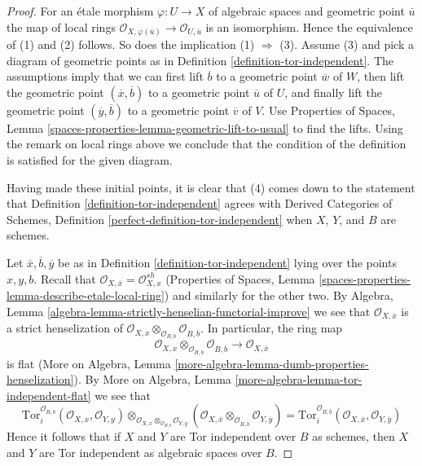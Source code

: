 \begin{proof}
For an \'etale morphism $\varphi : U \to X$ of algebraic spaces
and geometric point $\overline{u}$ the map of local rings
$\mathcal{O}_{X, \varphi(\overline{u})} \to \mathcal{O}_{U, \overline{u}}$
is an isomorphism. Hence the equivalence of (1) and (2) follows.
So does the implication (1) $\Rightarrow$ (3). Assume (3) and
pick a diagram of geometric points as in
Definition \ref{definition-tor-independent}.
The assumptions imply that we can first lift $\overline{b}$ to a geometric
point $\overline{w}$ of $W$, then lift the geometric point
$(\overline{x}, \overline{b})$ to a geometric point $\overline{u}$ of $U$,
and finally lift the geometric point
$(\overline{y}, \overline{b})$ to a geometric point $\overline{v}$ of $V$.
Use Properties of Spaces, Lemma
\ref{spaces-properties-lemma-geometric-lift-to-usual}
to find the lifts.
Using the remark on local rings above we conclude that the condition
of the definition is satisfied for the given diagram.

\medskip\noindent
Having made these initial points, it is clear that (4) comes down to the
statement that
Definition \ref{definition-tor-independent}
agrees with
Derived Categories of Schemes, Definition
\ref{perfect-definition-tor-independent}
when $X$, $Y$, and $B$ are schemes.

\medskip\noindent
Let $\overline{x}, \overline{b}, \overline{y}$ be as in
Definition \ref{definition-tor-independent} lying over the points
$x, y, b$. Recall that
$\mathcal{O}_{X, \overline{x}} = \mathcal{O}_{X, x}^{sh}$
(Properties of Spaces, Lemma
\ref{spaces-properties-lemma-describe-etale-local-ring}) and similarly
for the other two. By Algebra, Lemma
\ref{algebra-lemma-strictly-henselian-functorial-improve} we see that
$\mathcal{O}_{X, \overline{x}}$ is a strict henselization of
$\mathcal{O}_{X, x} \otimes_{\mathcal{O}_{B, b}} \mathcal{O}_{B, \overline{b}}$.
In particular, the ring map
$$
\mathcal{O}_{X, x} \otimes_{\mathcal{O}_{B, b}} \mathcal{O}_{B, \overline{b}}
\longrightarrow
\mathcal{O}_{X, \overline{x}}
$$
is flat (More on Algebra, Lemma
\ref{more-algebra-lemma-dumb-properties-henselization}). By
More on Algebra, Lemma \ref{more-algebra-lemma-tor-independent-flat}
we see that
$$
\text{Tor}_i^{\mathcal{O}_{B, b}}(\mathcal{O}_{X, x}, \mathcal{O}_{Y, y})
\otimes_{\mathcal{O}_{X, x} \otimes_{\mathcal{O}_{B, b}} \mathcal{O}_{Y, y}}
(\mathcal{O}_{X, \overline{x}} \otimes_{\mathcal{O}_{B, \overline{b}}}
\mathcal{O}_{Y, \overline y})
=
\text{Tor}_i^{\mathcal{O}_{B, \overline{b}}}(
\mathcal{O}_{X, \overline{x}}, \mathcal{O}_{Y, \overline{y}})
$$
Hence it follows that if $X$ and $Y$ are Tor independent over $B$
as schemes, then $X$ and $Y$ are Tor independent as algebraic spaces over $B$.


\end{proof}
